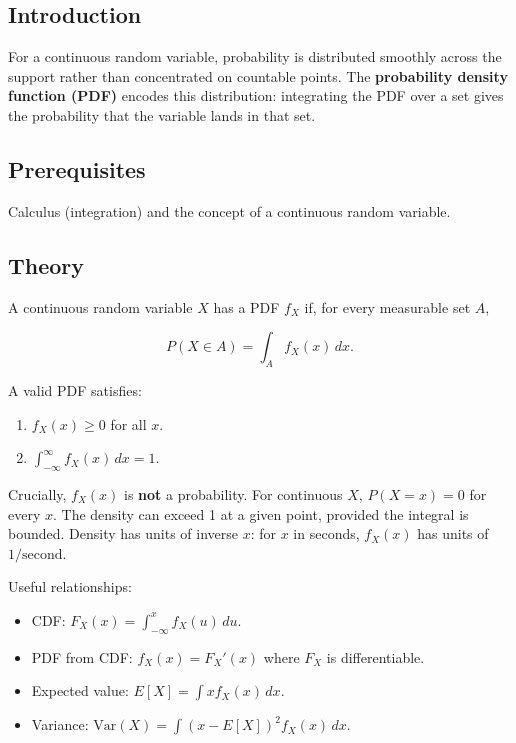 \documentclass[
]{article}
\author{}
\date{\vspace{-2.5em}}
\providecommand{\tightlist}{%
  \setlength{\itemsep}{0pt}\setlength{\parskip}{0pt}}
\begin{document}
\subsection{Introduction}\label{introduction}

For a continuous random variable, probability is distributed smoothly
across the support rather than concentrated on countable points. The
\textbf{probability density function (PDF)} encodes this distribution:
integrating the PDF over a set gives the probability that the variable
lands in that set.

\subsection{Prerequisites}\label{prerequisites}

Calculus (integration) and the concept of a continuous random variable.

\subsection{Theory}\label{theory}

A continuous random variable \(X\) has a PDF \(f_X\) if, for every
measurable set \(A\),

\[P(X \in A) = \int_A f_X(x) \, dx.\]

A valid PDF satisfies:

\begin{enumerate}
\def\labelenumi{\arabic{enumi}.}
\tightlist
\item
  \(f_X(x) \geq 0\) for all \(x\).
\item
  \(\int_{-\infty}^{\infty} f_X(x) \, dx = 1\).
\end{enumerate}

Crucially, \(f_X(x)\) is \textbf{not} a probability. For continuous
\(X\), \(P(X = x) = 0\) for every \(x\). The density can exceed 1 at a
given point, provided the integral is bounded. Density has units of
inverse \(x\): for \(x\) in seconds, \(f_X(x)\) has units of
\(1/\text{second}\).

Useful relationships:

\begin{itemize}
\tightlist
\item
  CDF: \(F_X(x) = \int_{-\infty}^x f_X(u) \, du\).
\item
  PDF from CDF: \(f_X(x) = F_X'(x)\) where \(F_X\) is differentiable.
\item
  Expected value: \(E[X] = \int x f_X(x) \, dx\).
\item
  Variance: \(\mathrm{Var}(X) = \int (x - E[X])^2 f_X(x) \, dx\).
\end{itemize}
\end{document}
